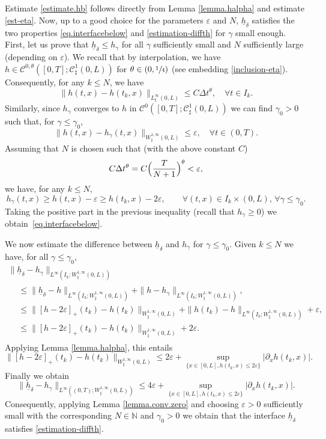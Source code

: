 \documentclass[JEP,XML,SOM,Unicode,NoFloatCountersInSection]{cedram}
\let\mathcal\mathscr
\theoremstyle{remark}
\theoremstyle{definition}
\newcommand{\Natural}{\mathbb{N}}
\newcommand{\hb}{{\underline{h}}}
\begin{document}
Estimate \eqref{estimate.hb} follows directly from Lemma \ref{lemma.halpha} and estimate \eqref{est-eta}.
Now, up to a good choice for the parameters $\varepsilon$ and $N$, $\hb_{\delta}$ satisfies the two
properties \eqref{eq.interfacebelow} and \eqref{estimation-diffth} for $\gamma$ small enough. First, let us prove that $\hb_{\delta}\leq h_{\gamma}$ for all $\gamma$ sufficiently small and $N$ sufficiently large (depending on $\varepsilon$). We recall that by interpolation, we have $h \in \mathcal{C}^{0,\theta}([0,T];\mathcal{C}^{1}_{\sharp}(0,L))$ for $\theta\in(0,\sfrac{1}{4})$ (see embedding \eqref{inclusion-eta}). Consequently, for any $k \leq N$, we have
\[
\|h(t,x) - h(t_{k},x)\|_{L^{\infty}_{\sharp}(0,L)} \leq C \Delta t^{\theta}, \quad \forall t \in I_k.
\]
Similarly, since $h_{\gamma}$ converges to $h$ in $\mathcal{C}^{0}([0,T];\mathcal{C}_\sharp^{1}(0,L))$ we can find $\gamma_0 >0$ such that, for $\gamma \leq \gamma_0$,
\[
\|h(t,x) - h_{\gamma}(t,x)\|_{W^{1,\infty}_{\sharp}(0,L)} \leq \varepsilon, \quad \forall t \in (0,T).
\]
Assuming that $N$ is chosen such that (with the above constant $C$)
\[
C \Delta t^{\theta}=C \Bigl(\dfrac T{N+1} \Bigr)^{\theta} < \varepsilon,
\]
we have, for any $k \leq N$,
\[
h_{\gamma}(t,x)\geq h(t,x)-\varepsilon\geq h(t_{k},x)-2\varepsilon, \qquad \forall(t,x)\in I_{k}\times(0,L),\,\forall \gamma\leq \gamma_{0}.
\]
Taking the positive part in the previous inequality (recall that $h_{\gamma}\!\geq\!0$) we obtain~\eqref{eq.interfacebelow}.

We now estimate the difference between $\hb_{\delta}$ and $h_{\gamma}$ for $\gamma \leq \gamma_0$.
Given $k \leq N$ we have, for all $\gamma \leq \gamma_0$,\vspace*{-3pt}
\begin{multline*}
\| \hb_{\delta}- h_\gamma\|_{L^\infty(I_k; W_\sharp^{1, \infty}(0, L))}\\
\begin{aligned}
&\leq \| \hb_{\delta}- h\|_{L^\infty(I_k; W_\sharp^{1, \infty}(0, L))}
+ \| h- h_\gamma\|_{L^\infty(I_k; W_\sharp^{1, \infty}(0, L))},\\
&\leq \| [h-2\varepsilon]_+(t_k)- h(t_k)\|_{W_\sharp^{1, \infty}(0, L)}
+\| h({t_k})- h\|_{L^\infty(I_k; W_\sharp^{1, \infty}(0, L))}
+ \varepsilon,\\
&\leq \| [h-2\varepsilon]_+(t_k)- h(t_k)\|_{W_\sharp^{1, \infty}(0, L)}
+2\varepsilon.
\end{aligned}
\end{multline*}
Applying Lemma \ref{lemma.halpha}, this entails
\[
\| [h-2\varepsilon]_+(t_k)- h(t_k)\|_{W_\sharp^{1, \infty}(0, L)}\leq 2\varepsilon +\sup_{\{x\in [0, L], h(t_k,x)\leq 2\varepsilon\}}\vert\partial_x h(t_k,x)\vert.
\]
Finally we obtain
\[
\| \hb_{\delta}- h_\gamma\|_{L^\infty((0,T); W_\sharp^{1, \infty}(0, L))}\leq 4 \varepsilon + \sup_{\{x\in [0, L], h(t_k, x)\leq 2\varepsilon\}}\vert\partial_x h(t_k,x )\vert. 
\]
Consequently, applying Lemma \ref{lemma.conv.zero} and choosing $\varepsilon>0$ sufficiently small with the corresponding $N \in\Natural$ and $\gamma_{0}>0$ we obtain that the interface $\hb_{\delta}$ satisfies \eqref{estimation-diffth}.
\end{document}
